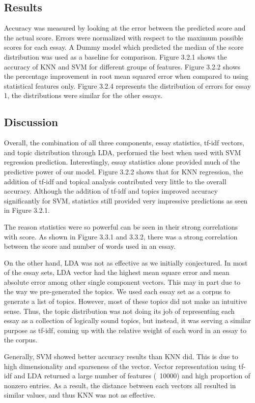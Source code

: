 \documentclass{article}
\begin{document}
\subsection{Results}
Accuracy was measured by looking at the error between the predicted score and the actual score. Errors were normalized with respect to the maximum possible scores for each essay. A Dummy model which predicted the median of the score distribution was used as a baseline for comparison. Figure 3.2.1 shows the accuracy of KNN and SVM for different groups of features. Figure 3.2.2 shows the percentage improvement in root mean squared error when compared to using statistical features only. Figure 3.2.4 represents the distribution of errors for essay 1, the distributions were similar for the other essays. 

\subsection{Discussion}
Overall, the combination of all three components, essay statistics, tf-idf vectors, and topic distribution through LDA, performed the best when used with SVM regression prediction. Interestingly, essay statistics alone provided much of the predictive power of our model. Figure 3.2.2 shows that for KNN regression, the addition of tf-idf and topical analysis contributed very little to the overall accuracy. Although the addition of tf-idf and topics improved accuracy significantly for SVM, statistics still provided very impressive predictions as seen in Figure 3.2.1. 

The reason statistics were so powerful can be seen in their strong correlations with score.  As shown in Figure 3.3.1 and 3.3.2, there was a strong correlation between the score and number of words used in an essay.

On the other hand, LDA was not as effective as we initially conjectured. In most of the essay sets, LDA vector had the highest mean square error and mean absolute error among other single component vectors. This may in part due to the way we pre-generated the topics. We used each essay set as a corpus to generate a list of topics. However, most of these topics did not make an intuitive sense. Thus, the topic distribution was not doing its job of representing each essay as a collection of logically sound topics, but instead, it was serving a similar purpose as tf-idf, coming up with the relative weight of each word in an essay to the corpus.
 
Generally, SVM showed better accuracy results than KNN did. This is due to high dimensionality and sparseness of the vector. Vector representation using tf-idf and LDA returned a large number of features (~10000) and high proportion of nonzero entries. As a result, the distance between each vectors all resulted in similar values, and thus KNN was not as effective.
 
\end{document}
